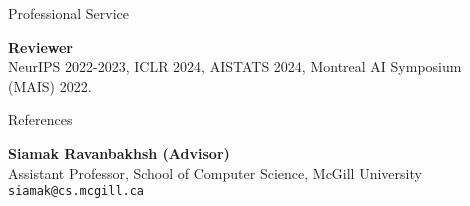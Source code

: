 \documentclass{resume}
\newcommand{\InternalSpace}{\vspace{0.18cm}}
\newenvironment{MySection}[1]
{\begin{category}{#1}}
{\end{category}}
\newcommand{\MyItem}{\citembullet}
\begin{document}
\InternalSpace



\begin{MySection}{Professional Service}

\MyItem \textbf{Reviewer} \\ NeurIPS 2022-2023, ICLR 2024, AISTATS 2024, Montreal AI Symposium (MAIS) 2022.

\end{MySection}

\InternalSpace



\begin{MySection}{References}

\MyItem \textbf{Siamak Ravanbakhsh (Advisor)}\\
Assistant Professor, School of Computer Science, McGill University\\
\texttt{siamak@cs.mcgill.ca}

\end{MySection}

\InternalSpace










\end{document}
